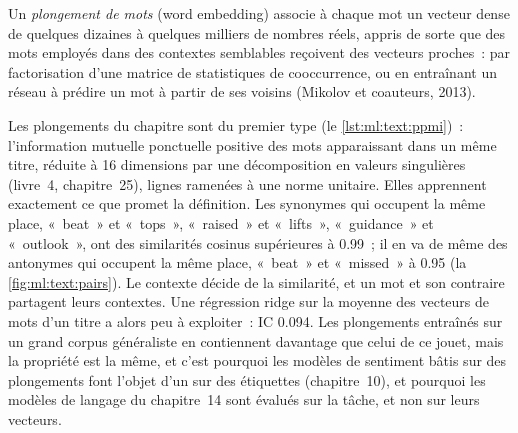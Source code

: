 \begin{definition}\label{def:ml:text-from-bag-of-words-to-embeddings:embedding}
Un \emph{plongement de mots} (word embedding) associe à chaque mot un vecteur dense de quelques dizaines à quelques milliers de nombres réels,
appris de sorte que des mots employés dans des contextes semblables reçoivent des vecteurs proches~: par factorisation d'une matrice de statistiques de cooccurrence, ou
en entraînant un réseau à prédire un mot à partir de ses voisins (Mikolov et coauteurs, 2013).
\end{definition}

Les plongements du chapitre sont du premier type (le \cref{lst:ml:text:ppmi})~: l'information mutuelle ponctuelle positive des mots
apparaissant dans un même titre, réduite à 16 dimensions par une décomposition en valeurs singulières (livre~4, chapitre~25), lignes
ramenées à une norme unitaire. Elles apprennent exactement ce que promet la définition. Les synonymes qui occupent la même place, «~beat~» et
«~tops~», «~raised~» et «~lifts~», «~guidance~» et «~outlook~», ont des similarités cosinus supérieures à 0.99~; il en va de même des antonymes qui
occupent la même place, «~beat~» et «~missed~» à 0.95 (la \cref{fig:ml:text:pairs}). Le contexte décide de la similarité, et un mot et
son contraire partagent leurs contextes. Une régression ridge sur la moyenne des vecteurs de mots d'un titre a alors peu à
exploiter~: IC 0.094. Les plongements entraînés sur un grand corpus généraliste en contiennent davantage que celui de ce jouet, mais la propriété est la même, et
c'est pourquoi les modèles de sentiment bâtis sur des plongements font l'objet d'un  sur des étiquettes (chapitre~10), et pourquoi les modèles de langage du chapitre~14
sont évalués sur la tâche, et non sur leurs vecteurs.

